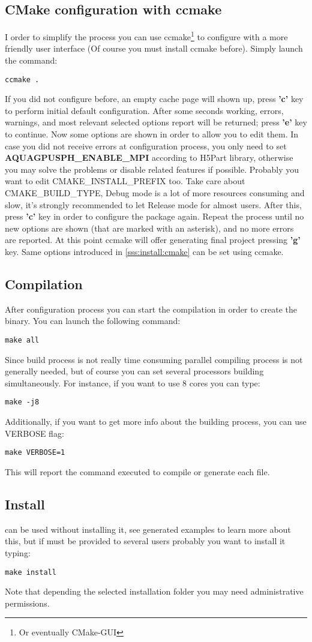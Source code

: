 \subsection{CMake configuration with ccmake}
%
I order to simplify the process you can use ccmake\footnote{Or eventually CMake-GUI}
to configure \NAME with a more friendly user interface (Of course you must install
ccmake before). Simply launch the command:
%
\begin{verbatim}
ccmake .
\end{verbatim}
%
If you did not configure \NAME before, an empty cache page will shown up, press
\textbf{'c'} key to perform initial default configuration. After some seconds working,
errors, warnings, and most relevant selected options report will be returned; press
\textbf{'e'} key to continue.\rc
%
Now some options are shown in order to allow you to edit them. In case you did not
receive errors at configuration process, you only need to set
\textbf{AQUAGPUSPH\_ENABLE\_MPI} according to H5Part library, otherwise you may solve
the problems or disable related features if possible.\rc
%
Probably you want to edit CMAKE\_INSTALL\_PREFIX too. Take care about
CMAKE\_BUILD\_TYPE, Debug mode is a lot of more resources consuming and slow, it's
strongly recommended to let Release mode for almost users.\rc
%
After this, press \textbf{'c'} key in order to configure the package again. Repeat the
process until no new options are shown (that are marked with an asterisk), and no more
errors are reported. At this point ccmake will offer generating final project pressing
\textbf{'g'} key.\rc
%
Same options introduced in \ref{sss:install:cmake} can be set using ccmake.
%
\subsection{Compilation}
%
After configuration process you can start the compilation in order to create the binary.
You can launch the following command:
%
\begin{verbatim}
make all
\end{verbatim}
%
Since \NAME build process is not really time consuming parallel compiling process is not
generally needed, but of course you can set several processors building simultaneously.
For instance, if you want to use 8 cores you can type:
%
\begin{verbatim}
make -j8
\end{verbatim}
%
Additionally, if you want to get more info about the building process, you can use
VERBOSE flag:
%
\begin{verbatim}
make VERBOSE=1
\end{verbatim}
%
This will report the command executed to compile or generate each file.
%
\subsection{Install}
%
\NAME can be used without installing it, see generated examples to learn more about this,
but if \NAME must be provided to several users probably you want to install it typing:
%
\begin{verbatim}
make install
\end{verbatim}
%
Note that depending the selected installation folder you may need administrative permissions.
%